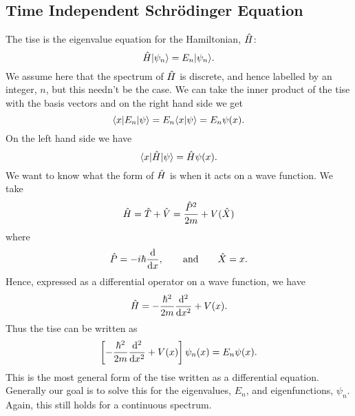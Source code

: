     \subsection{Time Independent Schr\"odinger Equation}
    The \gls{tise} is the eigenvalue equation for the Hamiltonian, \(\hat{H}\):
    \[\hat{H}\vert {\psi_n} \rangle = E_n\vert {\psi_n} \rangle.\]
    We assume here that the spectrum of \(\hat{H}\) is discrete, and hence labelled by an integer, \(n\), but this needn't be the case.
    We can take the inner product of the \gls{tise} with the basis vectors and on the right hand side we get
    \[\langle {x} \vert E_n\vert {\psi} \rangle = E_n\langle {x} \vert {\psi} \rangle = E_n\psi(x).\]
    On the left hand side we have
    \[\langle {x} \vert\hat{H}\vert {\psi} \rangle = \hat{H}\psi(x).\]
    We want to know what the form of \(\hat{H}\) is when it acts on a wave function.
    We take
    \[\hat{H} = \hat{T} + \hat{V} = \frac{\hat{P}^2}{2m} + V(\hat{X})\]
    where
    \[\hat{P} = -i\hbar\dv{x},\qquad\text{and}\qquad \hat{X} = x.\]
    Hence, expressed as a differential operator on a wave function, we have
    \[\hat{H} = -\frac{\hbar^2}{2m}\dv[2]{x} + V(x).\]
    Thus the \gls{tise} can be written as
    \[\left[-\frac{\hbar^2}{2m}\dv[2]{x} + V(x)\right]\psi_n(x) = E_n\psi(x).\]
    This is the most general form of the \gls{tise} written as a differential equation.
    Generally our goal is to solve this for the eigenvalues, \(E_n\), and eigenfunctions, \(\psi_n\).
    Again, this still holds for a continuous spectrum.
    
